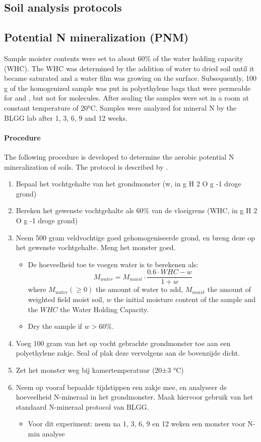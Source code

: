 \documentclass[10pt,twoside,dutch,english]{report}
\begin{document}
\begin{appendices}
\chapter{Soil analysis protocols}
		\label{chap: Protocols}
\section{Potential N mineralization (PNM)}
Sample moister contents were set to about 60\% of the water holding capacity (WHC). The WHC was determined by the addition of water to dried soil until it became saturated and a water film was growing on the surface. Subsequently, 100 g of the homogenized sample was put in polyethylene bags that were permeable for  and  , but not for  molecules. After sealing the samples were set in a room at constant temperature of 20°C. Samples were analyzed for mineral N by the BLGG lab after 1, 3, 6, 9 and 12 weeks. 

\subsubsection{Procedure}
The following procedure is developed to determine the aerobic potential N mineralization of soils. The protocol is described by \citet{Ros2014}. 
\begin{enumerate}
\item Bepaal het vochtgehalte van het grondmonster (w, in g H 2 O g -1  droge grond) 
\item  Bereken het gewenste vochtgehalte als 60\% van de vloeigrens (WHC, in g H 2 O g -1  droge grond)
\item Neem 500 gram veldvochtige goed gehomogeniseerde grond, en breng deze op het gewenste 
vochtgehalte. Meng het monster goed. 
\begin{itemize}
\item De hoeveelheid toe te voegen water is te berekenen als: \begin{equation}  M_{water}=M_{moist} \cdot \frac{0.6\cdot WHC - w}{1 + w} \end{equation} where $M_{water} (\geq 0)$ the amount of water to add, $M_{moist}$ the amount of weighted field moist soil, $w$ the initial moisture content of the sample and the $WHC$ the Water Holding Capacity. 
\item Dry the sample if $w>60\%$. 
\end{itemize}
\item Voeg 100 gram van het op vocht gebrachte grondmonster toe aan een polyethylene zakje. Seal of plak deze vervolgens aan de bovenzijde dicht. 
\item Zet het monster weg bij kamertemperatuur (20±3 °C)
\item  Neem op vooraf bepaalde tijdstippen een zakje mee, en analyseer de hoeveelheid N-mineraal in het grondmonster. Maak hiervoor gebruik van het standaard N-mineraal protocol van BLGG. 
\begin{itemize}
\item Voor dit experiment: neem na 1, 3, 6, 9 en 12 weken een monster voor N-min analyse
\end{itemize}


\end{enumerate}
\end{appendices}
\end{document}
